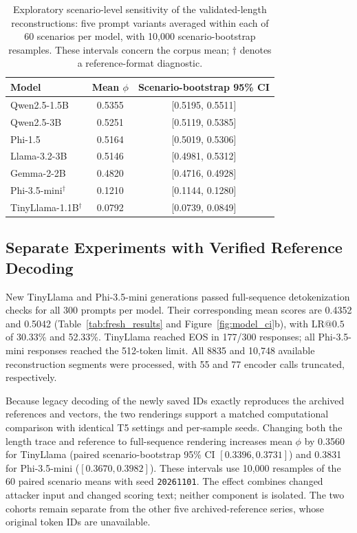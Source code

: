 \documentclass[electronics,article,submit,pdftex,moreauthors]{Definitions/mdpi}
\begin{document}
\begin{table}[ht]
\centering
\caption{Exploratory scenario-level sensitivity of the validated-length reconstructions: five prompt variants averaged within each of 60 scenarios per model, with 10,000 scenario-bootstrap resamples. These intervals concern the corpus mean; $\dagger$ denotes a reference-format diagnostic.}
\label{tab:scenario_sensitivity}
\begin{tabular}{l c c}
\toprule
Model & Mean $\phi$ & Scenario-bootstrap 95\% CI \\
\midrule
Qwen2.5-1.5B & 0.5355 & [0.5195, 0.5511] \\
Qwen2.5-3B & 0.5251 & [0.5119, 0.5385] \\
Phi-1.5 & 0.5164 & [0.5019, 0.5306] \\
Llama-3.2-3B & 0.5146 & [0.4981, 0.5312] \\
Gemma-2-2B & 0.4820 & [0.4716, 0.4928] \\
Phi-3.5-mini$^{\dagger}$ & 0.1210 & [0.1144, 0.1280] \\
TinyLlama-1.1B$^{\dagger}$ & 0.0792 & [0.0739, 0.0849] \\
\bottomrule
\end{tabular}
\end{table}

\subsection{Separate Experiments with Verified Reference Decoding}\label{sec:fresh}
New TinyLlama and Phi-3.5-mini generations passed full-sequence detokenization checks for all 300 prompts per model. Their corresponding mean scores are 0.4352 and 0.5042 (Table~\ref{tab:fresh_results} and Figure~\ref{fig:model_ci}b), with $\mathrm{LR}@0.5$ of 30.33\% and 52.33\%. TinyLlama reached EOS in 177/300 responses; all Phi-3.5-mini responses reached the 512-token limit. All 8835 and 10,748 available reconstruction segments were processed, with 55 and 77 encoder calls truncated, respectively.

Because legacy decoding of the newly saved IDs exactly reproduces the archived references and vectors, the two renderings support a matched computational comparison with identical T5 settings and per-sample seeds. Changing both the length trace and reference to full-sequence rendering increases mean $\phi$ by 0.3560 for TinyLlama (paired scenario-bootstrap 95\% CI $[0.3396,0.3731]$) and 0.3831 for Phi-3.5-mini ($[0.3670,0.3982]$). These intervals use 10,000 resamples of the 60 paired scenario means with seed \texttt{20261101}. The effect combines changed attacker input and changed scoring text; neither component is isolated. The two cohorts remain separate from the other five archived-reference series, whose original token IDs are unavailable.
\end{document}
